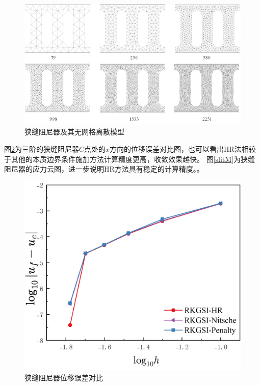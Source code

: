 \newpage
\begin{figure}[H]
    \centering
    \includegraphics[scale=0.65]{figure/DAMPER/SLIT/slit damper_msh.png}
    \caption{狭缝阻尼器及其无网格离散模型}\label{slitmsh}
\end{figure}
图\ref{slitx}为三阶的狭缝阻尼器$C$点处的$x$方向的位移误差对比图，也可以看出HR法相较于其他的本质边界条件施加方法计算精度更高，收敛效果越快。
图\ref{slitM}为狭缝阻尼器的应力云图，进一步说明HR方法具有稳定的计算精度。。
\begin{figure}[H]
    \centering
    \includegraphics[scale=0.5]{figure/DAMPER/SLIT/slit-x.png}
    \caption{狭缝阻尼器位移误差对比}\label{slitx}
\end{figure}
\newpage
